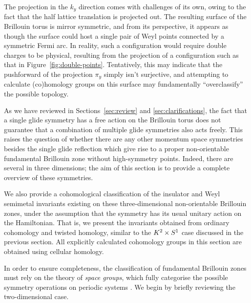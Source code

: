 The projection in the $k_y$ direction comes with challenges of its own, owing to the fact that the half lattice translation is projected out. The resulting surface of the Brillouin torus is mirror symmetric, and from its perspective, it appears as though the surface could host a single pair of Weyl points connected by a symmetric Fermi arc. In reality, such a configuration would require double charges to be physical, resulting from the projection of a configuration such as that in Figure~\ref{fig:double-points}. Tentatively, this may indicate that the pushforward of the projection $\pi_y$ simply isn't surjective, and attempting to calculate (co)homology groups on this surface may fundamentally ``overclassify'' the possible topology.


 \label{sec:non-ori_classification}

As we have reviewed in Sections~\ref{sec:review} and \ref{sec:clarifications}, the fact that a single glide symmetry has a free action on the Brillouin torus does not guarantee that a combination of multiple glide symmetries also acts freely. This raises the question of whether there are any other momentum space symmetries besides the single glide reflection which give rise to a proper non-orientable fundamental Brillouin zone without high-symmetry points. Indeed, there are several in three dimensions; the aim of this section is to provide a complete overview of these symmetries. 

We also provide a cohomological classification of the insulator and Weyl semimetal invariants existing on these three-dimensional non-orientable Brillouin zones, under the assumption that the symmetry has its usual unitary action on the Hamiltonian. That is, we present the invariants obtained from ordinary cohomology and twisted homology, similar to the $K^2\times S^1$ case discussed in the previous section. All explicitly calculated cohomology groups in this section are obtained using cellular homology.

In order to ensure completeness, the classification of fundamental Brillouin zones must rely on the theory of \emph{space groups}, which fully categorise the possible symmetry operations on periodic systems \cite{ITC_A}. We begin by briefly reviewing the two-dimensional case.

